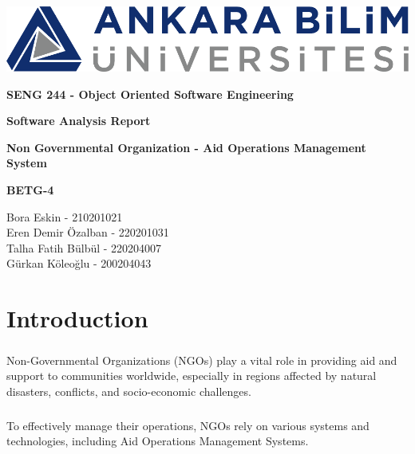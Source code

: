 \documentclass[a4paper,12pt]{report}
\begin{document}
	\begin{titlepage}
		\begin{center}
			\includegraphics{ankara_bilim.png}
		\end{center}
		\vspace{1cm}
		\begin{center}
			\LARGE
			\textbf{SENG 244 - Object Oriented Software Engineering}
		\end{center}
		\vspace{1cm}
		\begin{center}
			\Large
			\textbf{Software Analysis Report}
		\end{center}
		\vspace{1cm}
		\begin{center}
			\Large
			\textbf{Non Governmental Organization - Aid Operations Management System}
		\end{center}
		\vspace{2cm}
		\begin{center}
			\large
			\textbf{BETG-4}
		\end{center}
		\vspace{1cm}
		\begin{center}
			\large
			Bora Eskin - 210201021\\
			Eren Demir Özalban - 220201031\\
			Talha Fatih Bülbül - 220204007\\
			Gürkan Köleoğlu - 200204043
		\end{center}
	\end{titlepage}
	\tableofcontents
	\chapter{Introduction}
 		\paragraph{} Non-Governmental Organizations (NGOs) play a vital role in providing aid and support to communities worldwide, especially in regions affected by natural disasters, conflicts, and socio-economic challenges.
         	\paragraph{} To effectively manage their operations, NGOs rely on various systems and technologies, including Aid Operations Management Systems.
\end{document}
